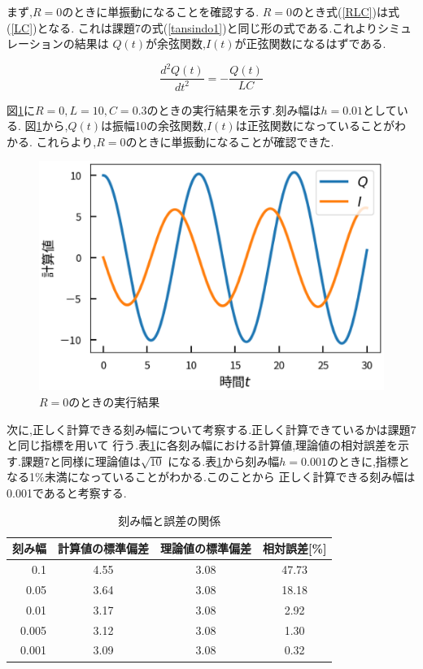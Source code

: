 \documentclass[a4j]{jarticle}
\begin{document}
        まず,$R=0$のときに単振動になることを確認する. $R=0$のとき式(\ref{RLC})は式(\ref{LC})となる.
        これは課題7の式(\ref{tansindo1})と同じ形の式である.これよりシミュレーションの結果は
        $Q(t)$が余弦関数,$I(t)$が正弦関数になるはずである.
        
        \begin{equation}
          \frac{d^2Q(t)}{dt^2} =-\frac{Q(t)}{LC}
          \label{LC}
        \end{equation}

        図\ref{r0}に$R=0,L=10,C=0.3$のときの実行結果を示す.刻み幅は$h=0.01$としている.
        図\ref{r0}から,$Q(t)$は振幅10の余弦関数,$I(t)$は正弦関数になっていることがわかる.
        これらより,$R=0$のときに単振動になることが確認できた.
        
        \begin{figure}[H]
          \centering
          \includegraphics[scale=0.6]{r0.eps}
          \caption{$R=0$のときの実行結果}
          \label{r0}
          \end{figure}

        次に,正しく計算できる刻み幅について考察する.正しく計算できているかは課題7と同じ指標を用いて
        行う.表\ref{h8}に各刻み幅における計算値,理論値の相対誤差を示す.課題7と同様に理論値は$\sqrt{10}$
        になる.表\ref{h8}から刻み幅$h=0.001$のときに,指標となる1\%未満になっていることがわかる.このことから
        正しく計算できる刻み幅は0.001であると考察する.
        \begin{table}[H]
          \caption{刻み幅と誤差の関係}
          \label{h8}
          \begin{center}
          \begin{tabular}{r|c|c|c}\hline
            刻み幅 & 計算値の標準偏差 & 理論値の標準偏差 & 相対誤差[\%] \\ \hline \hline 
            0.1 & 4.55 & 3.08 & 47.73 \\
            0.05 & 3.64 & 3.08 & 18.18 \\
            0.01 & 3.17 & 3.08 & 2.92 \\
            0.005 & 3.12 & 3.08 & 1.30 \\
            0.001 & 3.09 & 3.08 & 0.32 \\ \hline
          \end{tabular}
          \end{center}
          \end{table}
\end{document}
